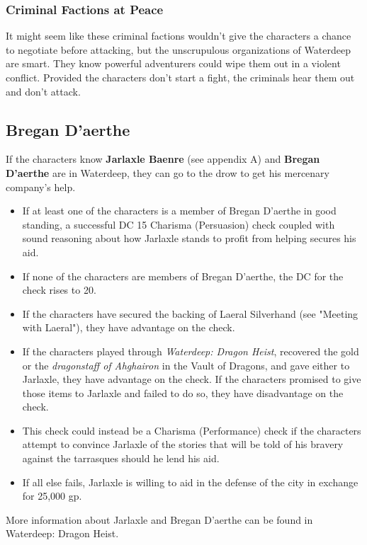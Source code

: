 \documentclass[10pt,a4paper,twoside,bg=print,twocolumn,openany,nodeprecatedcode]{dndbook}
\begin{document}
\subsubsection{Criminal Factions at Peace}
It might seem like these criminal factions wouldn't give the characters a chance to negotiate before attacking, but the unscrupulous organizations of Waterdeep are smart. They know powerful  adventurers could wipe them out in a violent conflict. Provided the characters don't start a fight, the criminals hear them out and don't attack.

\subsection{Bregan D'aerthe}
If the characters know \textbf{Jarlaxle Baenre} (see appendix A) and \textbf{Bregan D'aerthe} are in Waterdeep, they can go to the drow to get his mercenary company's help.


\begin{itemize}
\item If at least one of the characters is a member of Bregan D'aerthe in good standing, a successful DC 15 Charisma (Persuasion) check coupled with sound reasoning about how Jarlaxle stands to profit from helping secures his aid.
\item If none of the characters are members of Bregan D'aerthe, the DC for the check rises to 20.
\item If the characters have secured the backing of Laeral Silverhand (see "Meeting with Laeral"), they have advantage on the check.
\item If the characters played through \textit{Waterdeep: Dragon Heist}, recovered the gold or the \textit{dragonstaff of Ahghairon} in the Vault of Dragons, and gave either to Jarlaxle, they have advantage on the check. If the characters promised to give those items to Jarlaxle and failed to do so, they have disadvantage on the check.
\item This check could instead be a Charisma (Performance) check if the characters attempt to convince Jarlaxle of the stories that will be told of his bravery against the tarrasques should he lend his aid.
\item If all else fails, Jarlaxle is willing to aid in the defense of the city in exchange for 25,000 gp.
\end{itemize}

More information about Jarlaxle and Bregan D'aerthe can be found in Waterdeep: Dragon Heist.
\end{document}
